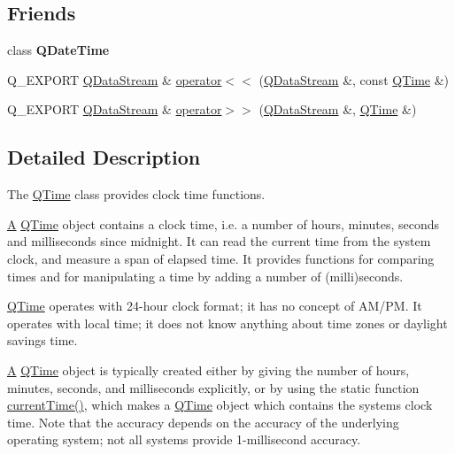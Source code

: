 \subsection*{Friends}
\begin{DoxyCompactItemize}
\item 
\mbox{\label{class_q_time_a9d2632bde958bcaf78a589a11578452e}} 
class {\bfseries Q\+Date\+Time}
\item 
Q\+\_\+\+E\+X\+P\+O\+RT \mbox{\hyperlink{class_q_data_stream}{Q\+Data\+Stream}} \& \mbox{\hyperlink{class_q_time_ac9b1103cf5f3deed4e057628fceca24d}{operator$<$$<$}} (\mbox{\hyperlink{class_q_data_stream}{Q\+Data\+Stream}} \&, const \mbox{\hyperlink{class_q_time}{Q\+Time}} \&)
\item 
Q\+\_\+\+E\+X\+P\+O\+RT \mbox{\hyperlink{class_q_data_stream}{Q\+Data\+Stream}} \& \mbox{\hyperlink{class_q_time_a6b14dcf689d047394691ac627c5d2074}{operator$>$$>$}} (\mbox{\hyperlink{class_q_data_stream}{Q\+Data\+Stream}} \&, \mbox{\hyperlink{class_q_time}{Q\+Time}} \&)
\end{DoxyCompactItemize}


\subsection{Detailed Description}
The \mbox{\hyperlink{class_q_time}{Q\+Time}} class provides clock time functions. 

\mbox{\hyperlink{class_a}{A}} \mbox{\hyperlink{class_q_time}{Q\+Time}} object contains a clock time, i.\+e. a number of hours, minutes, seconds and milliseconds since midnight. It can read the current time from the system clock, and measure a span of elapsed time. It provides functions for comparing times and for manipulating a time by adding a number of (milli)seconds.

\mbox{\hyperlink{class_q_time}{Q\+Time}} operates with 24-\/hour clock format; it has no concept of A\+M/\+PM. It operates with local time; it does not know anything about time zones or daylight savings time.

\mbox{\hyperlink{class_a}{A}} \mbox{\hyperlink{class_q_time}{Q\+Time}} object is typically created either by giving the number of hours, minutes, seconds, and milliseconds explicitly, or by using the static function \mbox{\hyperlink{class_q_time_a39b156ef7067e581f9fd70de6ef9ea4d}{current\+Time()}}, which makes a \mbox{\hyperlink{class_q_time}{Q\+Time}} object which contains the system\textquotesingle{}s clock time. Note that the accuracy depends on the accuracy of the underlying operating system; not all systems provide 1-\/millisecond accuracy.

